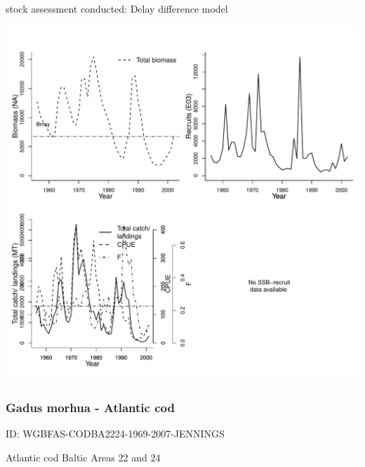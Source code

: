 stock assessment conducted: Delay difference model 
\begin{center}
\vspace{-0.2cm}\includegraphics[scale=0.65]{../tex/figures/plot-DFO-PAC-PCODWCVANI-1956-2002-COLLIE.pdf}
\end{center}

\newpage
\subsubsection{Gadus morhua - Atlantic cod}
ID: WGBFAS-CODBA2224-1969-2007-JENNINGS

Atlantic cod Baltic Areas 22 and 24 

